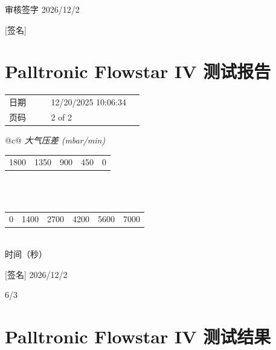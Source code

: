 \documentclass[UTF8,10pt,a4paper,fontset=fandol]{ctexart}
\newcommand{\fieldvalue}[1]{#1}
\newcommand{\handwritten}[1]{#1}
\begin{document}
\handwritten{审核签字 2026/12/2}

\vspace{2em}

\handwritten{[签名]}

\section*{Palltronic Flowstar IV 测试报告}

\begin{tabular}{@{}p{0.28\linewidth}p{0.62\linewidth}@{}}
日期 &
\fieldvalue{12/20/2025 10:06:34}
\\
页码 &
\fieldvalue{2 of 2}
\end{tabular}

\vspace{1em}

\begin{center}
\begin{tabular}{@{}c@{}}
\textit{大气压差 (mbar/min)}\\[-0.3em]
\begin{tabular}{c|c|c|c|c}
1800 & 1350 & 900 & 450 & 0
\end{tabular}\\[0.5em]
\\[-0.2em]
\begin{tabular}{c|c|c|c|c|c}
0 & 1400 & 2700 & 4200 & 5600 & 7000
\end{tabular}\\
时间（秒）
\end{tabular}
\end{center}

\vspace{1em}

\handwritten{[签名] 2026/12/2}

\vspace{1em}

\handwritten{6/3}

\newpage

\section{Palltronic Flowstar IV 测试结果}
\end{document}
